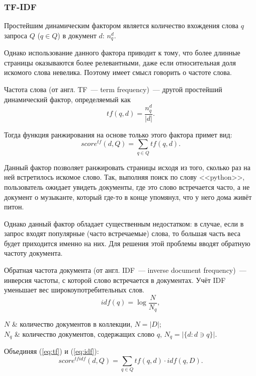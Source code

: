 \subsubsection{TF-IDF} \label{sssec:tf-idf}
Простейшим динамическим фактором является количество вхождения слова $q$ запроса $Q$ ($q\in Q$) в документ $d$: $n_q^d$.

Однако использование данного фактора приводит к тому, что более длинные страницы оказываются более релевантными, даже если относительная доля искомого слова невелика. Поэтому имеет смысл говорить о частоте слова.

Частота слова (от англ. TF~--- term frequency)~--- другой простейший динамический фактор, определяемый как
\begin{equation} \label{eq:tf}
  tf(q, d)=\frac{n_q^d}{|d|}.
\end{equation}

Тогда функция ранжирования на основе только этого фактора примет вид:
\begin{equation}
  score^{tf}(d, Q) = \sum_{q\in Q} tf(q, d).
\end{equation}

Данный фактор позволяет ранжировать страницы исходя из того, сколько раз на ней встретилось искомое слово. Так, выполняя поиск по слову <<python>>, пользователь ожидает увидеть документы, где это слово встречается часто, а не документ о музыканте, который где-то в конце упомянул, что у него дома живёт питон.

Однако данный фактор обладает существенным недостатком: в случае, если в запрос входят популярные (часто встречаемые) слова, то большая часть веса будет приходится именно на них. Для решения этой проблемы вводят обратную частоту документа.

Обратная частота документа (от англ. IDF~--- inverse document frequency)~--- инверсия частоты, с которой слово встречается в документах. Учёт IDF уменьшает вес широкоупотребительных слов.
\begin{equation} \label{eq:idf}
  idf(q)=\log\frac{N}{N_q},
\end{equation}
\begin{conditions}
  $N$ & количество документов в коллекции, $N=|D|$;\\
  $N_q$ & количество документов, содержащих слово $q$, $N_q=|\{d: d\ni q\}|$.
\end{conditions}

Объединяя (\ref{eq:tf}) и (\ref{eq:idf}):
\begin{equation}
  score^{tfidf}(d, Q) = \sum_{q\in Q} tf(q, d) \cdot idf(q, D).
\end{equation}


